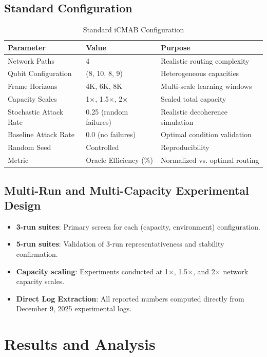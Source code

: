 \documentclass[12pt,a4paper]{article}
\begin{document}
\subsection{Standard Configuration}
\begin{table}[H]
\centering
\caption{Standard iCMAB Configuration}
\begin{tabular}{@{}lll@{}}
\toprule
\textbf{Parameter} & \textbf{Value} & \textbf{Purpose} \\
\midrule
Network Paths & 4 & Realistic routing complexity \\
Qubit Configuration & (8, 10, 8, 9) & Heterogeneous capacities \\
Frame Horizons & 4K, 6K, 8K & Multi-scale learning windows \\
Capacity Scales & 1$\times$, 1.5$\times$, 2$\times$ & Scaled total capacity \\
Stochastic Attack Rate & 0.25 (random failures) & Realistic decoherence simulation \\
Baseline Attack Rate & 0.0 (no failures) & Optimal condition validation \\
Random Seed & Controlled & Reproducibility \\
Metric & Oracle Efficiency (\%) & Normalized vs. optimal routing \\
\bottomrule
\end{tabular}
\end{table}

\subsection{Multi-Run and Multi-Capacity Experimental Design}
\begin{itemize}
\item \textbf{3-run suites}: Primary screen for each (capacity, environment) configuration.
\item \textbf{5-run suites}: Validation of 3-run representativeness and stability confirmation.
\item \textbf{Capacity scaling}: Experiments conducted at 1$\times$, 1.5$\times$, and 2$\times$ network capacity scales.
\item \textbf{Direct Log Extraction}: All reported numbers computed directly from December 9, 2025 experimental logs.
\end{itemize}

\newpage
\section{Results and Analysis}
\end{document}

